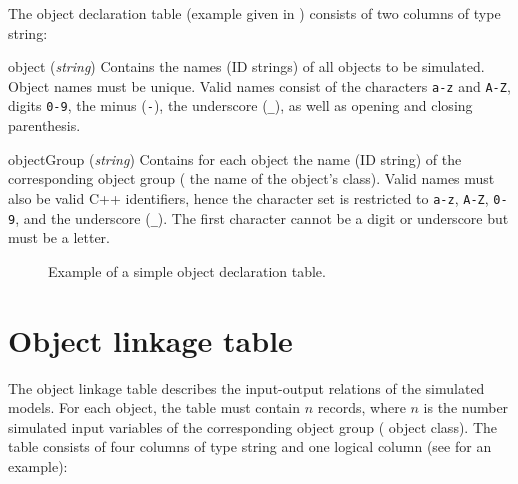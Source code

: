 The object declaration table (example given in ) consists of two columns of type string:

\begin{columndef}
  \item [object] (\textit{string}) Contains the names (ID strings) of all objects to be simulated. Object names must be unique. Valid names consist of the characters \verb!a-z! and \verb!A-Z!, digits \verb!0-9!, the minus (\verb!-!), the underscore (\verb!_!), as well as opening and closing parenthesis.
  \item [objectGroup] (\textit{string}) Contains for each object the name (ID string) of the corresponding object group (\ie{} the name of the object's class). Valid names must also be valid C++ identifiers, hence the character set is restricted to \verb!a-z!, \verb!A-Z!, \verb!0-9!, and the underscore (\verb!_!). The first character cannot be a digit or underscore but must be a letter.
\end{columndef}

\begin{figure*}[htbp]
  
  \caption{Example of a simple object declaration table. \label{fig:input-objectDeclarationTable}}
\end{figure*}

\section{Object linkage table} \label{sec:input-objectLinkageTable}

The object linkage table describes the input-output relations of the simulated models. For each object, the table must contain $n$ records, where $n$ is the number simulated input variables of the corresponding object group (\ie{} object class). The table consists of four columns of type string and one logical column (see  for an example):

